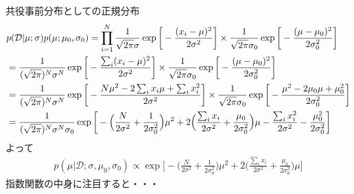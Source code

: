 \documentclass[aspectratio=169,unicode,dvipdfmx,14pt]{beamer}
\begin{document}
\begin{frame}{共役事前分布としての正規分布}
\FontMath
\vspace{-.2in}
\begin{align}
& p(\mathcal{D}|\mu;\sigma)p(\mu;\mu_0,\sigma_0)
= \prod_{i=1}^N \frac{1}{\sqrt{2\pi}\sigma}\exp\bigg[ - \frac{  (x_i - \mu)^2 }{2\sigma^2} \bigg]
\times \frac{1}{\sqrt{2\pi}\sigma_0} \exp \bigg[ - \frac{  (\mu - \mu_0)^2  }{2\sigma_0^2} \bigg]
\notag \\ & =
\frac{1}{(\sqrt{2\pi})^N\sigma^N}\exp\bigg[ - \frac{  \sum_i (x_i - \mu)^2 }{2\sigma^2} \bigg]
\times \frac{1}{\sqrt{2\pi}\sigma_0} \exp \bigg[ - \frac{  (\mu - \mu_0)^2  }{2\sigma_0^2} \bigg]
\notag \\ & =
\frac{1}{(\sqrt{2\pi})^N\sigma^N}\exp\bigg[ - \frac{  N\mu^2 - 2\sum_i x_i \mu + \sum_i x_i^2 }{2\sigma^2} \bigg]
\times \frac{1}{\sqrt{2\pi}\sigma_0} \exp \bigg[ - \frac{  \mu^2 - 2\mu_0\mu + \mu_0^2  }{2\sigma_0^2} \bigg]
\notag \\ & =
\frac{1}{(\sqrt{2\pi})^N\sigma^N\sigma_0}
\exp\bigg[ 
- \Big( \frac{N}{2\sigma^2} + \frac{1}{2\sigma_0^2} \Big) \mu^2 
+ 2 \Big( \frac{ \sum_i x_i}{2\sigma^2} + \frac{\mu_0}{2\sigma_0^2} \Big) \mu 
- \frac{ \sum_i x_i^2}{2\sigma^2} - \frac{\mu_0^2}{2\sigma_0^2} \bigg]
\end{align}
よって
\begin{align}
p(\mu | \mathcal{D}; \sigma, \mu_0, \sigma_0)
\propto
\exp\bigg[ 
- \Big( \frac{N}{2\sigma^2} + \frac{1}{2\sigma_0^2} \Big) \mu^2 
+ 2 \Big( \frac{ \sum_i x_i}{2\sigma^2} + \frac{\mu_0}{2\sigma_0^2} \Big) \mu \bigg]
\end{align}
指数関数の中身に注目すると・・・
\end{frame}
\end{document}
